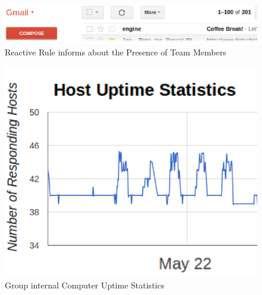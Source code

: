 \begin{figure}[!ht]
	\centering
  \includegraphics[width=\textwidth]{figures/gmail}
	\caption{Reactive Rule informs about the Presence of Team Members}
	\label{fig:gmail}
\end{figure}

\begin{figure}[!ht]
	\centering
  \includegraphics[width=\textwidth]{figures/histogram_2}
	\caption{Group internal Computer Uptime Statistics}
	\label{fig:histogram_2}
\end{figure}


